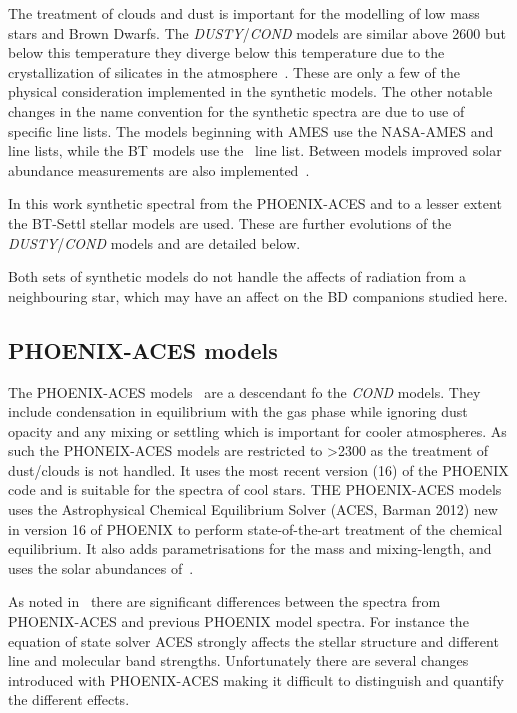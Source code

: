 The treatment of clouds and dust is important for the modelling of low mass stars and Brown Dwarfs.
The \emph{DUSTY}/\emph{COND} models are similar above 2600\K{} but below this temperature they diverge below this temperature due to the crystallization of silicates in the atmosphere~\citep{allard_limiting_2001}.
These are only a few of the physical consideration implemented in the synthetic models.
The other notable changes in the name convention for the synthetic spectra are due to use of specific line lists.
The models beginning with {AMES} use the {NASA-AMES}  and  line lists, while the {BT} models use the~\citet{barber_highaccuracy_2006}  line list.
Between models improved solar abundance measurements are also implemented~\citep[][]{asplund_chemical_2009}.

In this work synthetic spectral from the {PHOENIX-ACES} and to a lesser extent the {BT-Settl} stellar models are used.
These are further evolutions of the \emph{DUSTY}/\emph{COND} models and are detailed below.

Both sets of synthetic models do not handle the affects of radiation from a neighbouring star, which may have an affect on the BD companions studied here.

\subsection{{PHOENIX-ACES} models}
\label{subsec:phoenix_aces}

The {PHOENIX-ACES} models~\citep{husser_new_2013} are a descendant fo the \emph{COND} models.
They include condensation in equilibrium with the gas phase while ignoring dust opacity and any mixing or settling which is important for cooler atmospheres.
As such the {PHONEIX-ACES} models are restricted to \txteff{}>2300\K{} as the treatment of dust/clouds is not handled.
It uses the most recent version (16) of the {PHOENIX} code and is suitable for the spectra of cool stars.
THE {PHOENIX-ACES} models uses the Astrophysical Chemical Equilibrium Solver (ACES, Barman 2012) new in version 16 of {PHOENIX} to perform state-of-the-art treatment of the chemical equilibrium.
It also adds parametrisations for the mass and mixing-length, and uses the solar abundances of~\citet{asplund_chemical_2009}.

As noted in~\citep{husser_new_2013} there are significant differences between the spectra from {PHOENIX-ACES} and previous {PHOENIX} model spectra.
For instance the equation of state solver ACES strongly affects the stellar structure and different line and molecular band strengths.
Unfortunately there are several changes introduced with {PHOENIX-ACES} making it difficult to distinguish and quantify the different effects.

